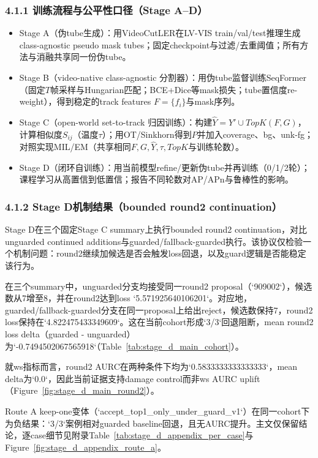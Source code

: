 \documentclass[UTF8]{ctexart}
\begin{document}
\subsubsection*{4.1.1 训练流程与公平性口径（Stage A--D）}
\begin{itemize}
\item Stage A（伪tube生成）：用VideoCutLER在LV-VIS train/val/test推理生成class-agnostic pseudo mask tubes；固定checkpoint与过滤/去重阈值；所有方法与消融共享同一份伪tube。
\item Stage B（video-native class-agnostic 分割器）：用伪tube监督训练SeqFormer（固定$T$帧采样与Hungarian匹配；BCE+Dice等mask损失；tube置信度re-weight），得到稳定的track features $F=\{f_i\}$与mask序列。
\item Stage C（open-world set-to-track 归因训练）：构建$\hat{Y}=Y'\cup TopK(F,G)$，计算相似度$S_{ij}$（温度$\tau$）；用OT/Sinkhorn得到$P$并加入coverage、bg、unk-fg；对照实现MIL/EM（共享相同$F,G,\hat{Y},\tau,TopK$与训练轮数）。
\item Stage D（闭环自训练）：用当前模型refine/更新伪tube并再训练（0/1/2轮）；课程学习从高置信到低置信；报告不同轮数对AP/APn与鲁棒性的影响。
\end{itemize}

\subsubsection*{4.1.2 Stage D机制结果（bounded round2 continuation）}
Stage D在三个固定Stage C summary上执行bounded round2 continuation，对比unguarded continued additions与guarded/fallback-guarded执行。该协议仅检验一个机制问题：round2继续加候选是否会触发loss回退，以及guard逻辑是否能稳定该行为。

在三个summary中，unguarded分支均接受同一round2 proposal（`909002`），候选数从7增至8，并在round2达到loss `5.571925640106201`。对应地，guarded/fallback-guarded分支在同一proposal上给出reject，候选数保持7，round2 loss保持在`4.822475433349609`。这在当前cohort形成`3/3`回退阻断，mean round2 loss delta（guarded - unguarded）为`-0.7494502067565918`（Table~\ref{tab:stage_d_main_cohort}）。

就ws指标而言，round2 AURC在两种条件下均为`0.5833333333333333`，mean delta为`0.0`，因此当前证据支持damage control而非ws AURC uplift（Figure~\ref{fig:stage_d_main_round2}）。

Route A keep-one变体（`accept_top1_only_under_guard_v1`）在同一cohort下为负结果：`3/3`案例相对guarded baseline回退，且无AURC提升。主文仅保留结论，逐case细节见附录Table~\ref{tab:stage_d_appendix_per_case}与Figure~\ref{fig:stage_d_appendix_route_a}。
\end{document}
